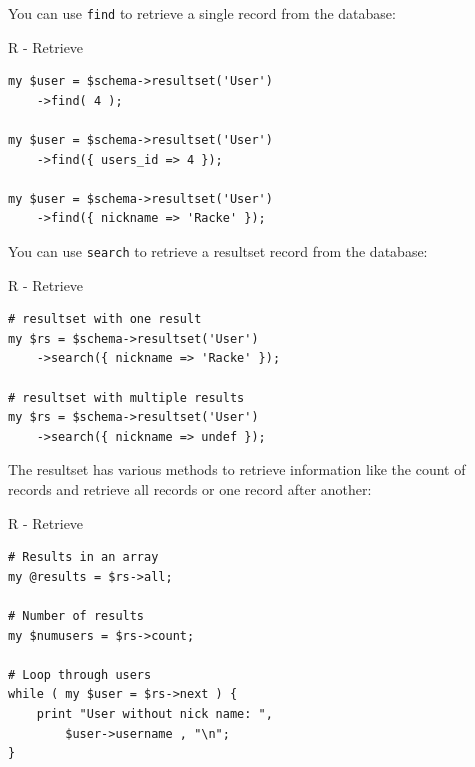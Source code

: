 You can use \verb|find| to retrieve a single record from
the database:

\begin{frame}[fragile]{R - Retrieve}
\begin{lstlisting}
my $user = $schema->resultset('User')
    ->find( 4 );

my $user = $schema->resultset('User')
    ->find({ users_id => 4 });

my $user = $schema->resultset('User')
    ->find({ nickname => 'Racke' });
\end{lstlisting}
\end{frame}


You can use \verb|search| to retrieve a resultset record from
the database:

\begin{frame}[fragile]{R - Retrieve}
\begin{lstlisting}
# resultset with one result
my $rs = $schema->resultset('User')
    ->search({ nickname => 'Racke' });

# resultset with multiple results
my $rs = $schema->resultset('User')
    ->search({ nickname => undef });
\end{lstlisting}
\end{frame}

The resultset has various methods to retrieve information
like the count of records and retrieve all records or
one record after another:

\begin{frame}[fragile]{R - Retrieve}
\begin{lstlisting}
# Results in an array
my @results = $rs->all;

# Number of results
my $numusers = $rs->count;

# Loop through users
while ( my $user = $rs->next ) {
    print "User without nick name: ",
        $user->username , "\n";
}
\end{lstlisting}
\end{frame}



